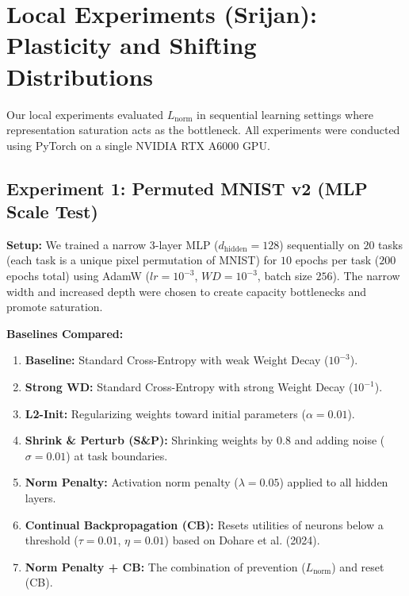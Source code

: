 \documentclass[11pt,a4paper]{article}
\begin{document}
\newpage

\section{Local Experiments (Srijan): Plasticity and Shifting Distributions}
\label{sec:local}

Our local experiments evaluated $L_{\text{norm}}$ in sequential learning settings where representation saturation acts as the bottleneck. All experiments were conducted using PyTorch on a single NVIDIA RTX A6000 GPU.

\subsection{Experiment 1: Permuted MNIST v2 (MLP Scale Test)}
\textbf{Setup:} We trained a narrow 3-layer MLP ($d_{\text{hidden}} = 128$) sequentially on $20$ tasks (each task is a unique pixel permutation of MNIST) for $10$ epochs per task ($200$ epochs total) using AdamW ($lr=10^{-3}$, $WD=10^{-3}$, batch size $256$). The narrow width and increased depth were chosen to create capacity bottlenecks and promote saturation.

\textbf{Baselines Compared:}
\begin{enumerate}
    \item \textbf{Baseline:} Standard Cross-Entropy with weak Weight Decay ($10^{-3}$).
    \item \textbf{Strong WD:} Standard Cross-Entropy with strong Weight Decay ($10^{-1}$).
    \item \textbf{L2-Init:} Regularizing weights toward initial parameters ($\alpha=0.01$).
    \item \textbf{Shrink \& Perturb (S\&P):} Shrinking weights by $0.8$ and adding noise ($\sigma=0.01$) at task boundaries.
    \item \textbf{Norm Penalty:} Activation norm penalty ($\lambda=0.05$) applied to all hidden layers.
    \item \textbf{Continual Backpropagation (CB):} Resets utilities of neurons below a threshold ($\tau=0.01$, $\eta=0.01$) based on Dohare et al. (2024).
    \item \textbf{Norm Penalty + CB:} The combination of prevention ($L_{\text{norm}}$) and reset (CB).
\end{enumerate}
\end{document}
